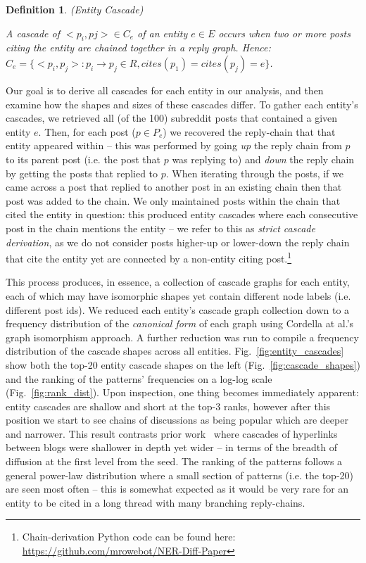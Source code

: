 \documentclass[acmsmall]{acmart}
\newtheorem{mydef}{Definition}
\begin{document}
\begin{mydef}
(Entity Cascade) 

A cascade of ${<p_i, pj>} \in C_e$ of an entity $e \in E$ occurs when two or more posts citing the entity are chained together in a reply graph. 
Hence: $C_e = \{<p_i, p_j> : p_i \rightarrow p_j \in R, cites(p_1) = cites(p_j) = e\}$.
\end{mydef}

Our goal is to derive all cascades for each entity in our analysis, and then examine how the shapes and sizes of these cascades differ.
To gather each entity's cascades, we retrieved all (of the 100) subreddit posts that contained a given entity $e$.
Then, for each post ($p \in P_e$) we recovered the reply-chain that that entity appeared within -- this was performed by going \emph{up} the reply chain from $p$ to its parent post (i.e. the post that $p$ was replying to) and \emph{down} the reply chain by getting the posts that replied to $p$.
When iterating through the posts, if we came across a post that replied to another post in an existing chain then that post was added to the chain.
We only maintained posts within the chain that cited the entity in question: this produced entity cascades where each consecutive post in the chain mentions the entity -- we refer to this as \emph{strict cascade derivation}, as we do not consider posts higher-up or lower-down the reply chain that cite the entity yet are connected by a non-entity citing post.\footnote{Chain-derivation Python code can be found here: \url{https://github.com/mrowebot/NER-Diff-Paper}}

This process produces, in essence, a collection of cascade graphs for each entity, each of which may have isomorphic shapes yet contain different node labels (i.e. different post ids).
We reduced each entity's cascade graph collection down to a frequency distribution of the \emph{canonical form} of each graph using Cordella at al.'s~\cite{cordella2001improved} graph isomorphism approach.
A further reduction was run to compile a frequency distribution of the cascade shapes across all entities.
Fig.~\ref{fig:entity_cascades} show both the top-20 entity cascade shapes on the left (Fig.~\ref{fig:cascade_shapes}) and the ranking of the patterns' frequencies on a log-log scale (Fig.~\ref{fig:rank_dist}).
Upon inspection, one thing becomes immediately apparent: entity cascades are shallow and short at the top-3 ranks, however after this position we start to see chains of discussions as being popular which are deeper and narrower.
This result contrasts prior work~\cite{leskovec2007patterns} where cascades of hyperlinks between blogs were shallower in depth yet wider -- in terms of the breadth of diffusion at the first level from the seed. 
The ranking of the patterns follows a general power-law distribution where a small section of patterns (i.e. the top-20) are seen most often -- this is somewhat expected as it would be very rare for an entity to be cited in a long thread with many branching reply-chains.
\end{document}
